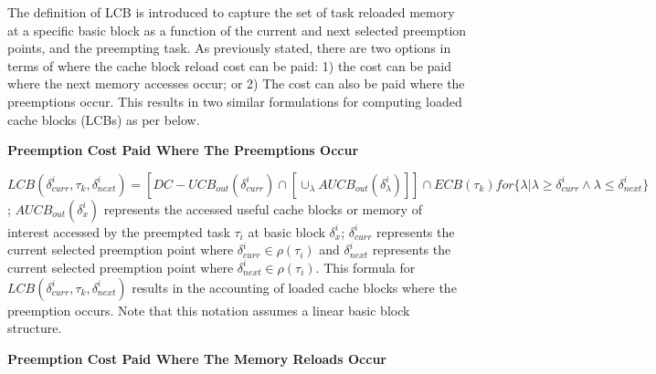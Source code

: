 The definition of LCB is introduced to capture the set of task reloaded memory at a specific basic block as a function of the current and next selected preemption points, and the preempting task.  As previously stated, there are two options in terms of where the cache block reload cost can be paid: 1) the cost can be paid where the next memory accesses occur; or 2) The cost can also be paid where the preemptions occur.  This results in two similar formulations for computing loaded cache blocks (LCBs) as per below.

\textbf{Preemption Cost Paid Where The Preemptions Occur}

\begin{math}LCB(\delta_{curr}^{i},\tau_{k},\delta_{next}^{i}) = [DC-UCB_{out}(\delta_{curr}^{i}) \cap [\cup_\lambda AUCB_{out}(\delta_{\lambda}^{i})]] \cap ECB(\tau_{k}) for \{\lambda | \lambda \geq \delta_{curr}^{i} \wedge \lambda \leq \delta_{next}^{i}\}\end{math}; \begin{math}AUCB_{out}(\delta_{x}^{i})\end{math} represents the accessed useful cache blocks or memory of interest accessed by the preempted task \begin{math}\tau_{i}\end{math} at basic block \begin{math}\delta_{x}^{i}\end{math}; \begin{math}\delta_{curr}^{i}\end{math} represents the current selected preemption point where \begin{math}\delta_{curr}^{i} \in \rho(\tau_{i})\end{math} and \begin{math}\delta_{next}^{i}\end{math} represents the current selected preemption point where \begin{math}\delta_{next}^{i} \in \rho(\tau_{i})\end{math}.  This formula for \begin{math}LCB(\delta_{curr}^{i},\tau_{k},\delta_{next}^{i})\end{math} results in the accounting of loaded cache blocks where the preemption occurs.  Note that this notation assumes a linear basic block structure.

\textbf{Preemption Cost Paid Where The Memory Reloads Occur}

